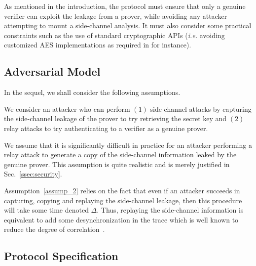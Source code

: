 As mentioned in the introduction, the protocol must ensure that only a genuine verifier can exploit the leakage from a prover, while avoiding any attacker attempting to mount a side-channel analysis. It must also consider some practical constraints such as the use of standard cryptographic APIs (\emph{i.e.} avoiding customized AES implementations as required in \cite{SakiyamaMMKHMMN15} for instance). 

\subsection{Adversarial Model}
In the sequel, we shall consider the following assumptions.
\begin{assumption}
\label{assump_1}
We consider an attacker who can perform $(1)$ side-channel attacks by capturing the side-channel leakage of the prover to try retrieving the secret key and $(2)$ relay attacks to try authenticating to a verifier as a genuine prover. 
\end{assumption}


\begin{assumption}
\label{assump_2}
We assume that it is significantly difficult in practice for an attacker performing a relay attack to generate a copy of the side-channel information leaked by the genuine prover. This assumption is quite realistic and is merely justified in Sec.~\ref{ssec:security}.
\end{assumption}


Assumption~\ref{assump_2} relies on the fact that even if an attacker succeeds in capturing, copying and replaying the side-channel leakage, then this procedure will take some time denoted $\Delta$. Thus, replaying the side-channel information is equivalent to add some desynchronization in the trace which is well known to reduce the degree of correlation~\cite{DBLP:books/daglib/0017272}.


\subsection{Protocol Specification}
\label{sec_proposal}
